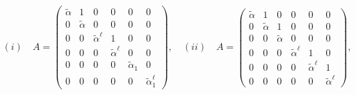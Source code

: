 \documentclass[11pt,a4paper]{article}
\theoremstyle{plain}
\theoremstyle{definition}
\theoremstyle{remark}
\begin{document}
\[
(i)\quad A =
\begin{pmatrix}
\tilde{\alpha} & 1 & 0 & 0 & 0 & 0\\
0 & \tilde{\alpha} & 0 & 0 & 0 & 0\\
0 & 0 & \tilde{\alpha}^\ell & 1 & 0 & 0\\
0 & 0 & 0 & \tilde{\alpha}^{\ell} & 0 & 0\\
0 & 0 & 0 & 0 & \tilde{\alpha}_1 & 0\\
0 & 0 & 0 & 0 & 0 & \tilde{\alpha}_1^{\ell}
\end{pmatrix},\quad (ii)\quad A =
\begin{pmatrix}
\tilde{\alpha} & 1 & 0 & 0 & 0 & 0\\
0 & \tilde{\alpha} & 1 & 0 & 0 & 0\\
0 & 0 & \tilde{\alpha} & 0 & 0 & 0\\
0 & 0 & 0 & \tilde{\alpha}^{\ell} & 1 & 0\\
0 & 0 & 0 & 0 & \tilde{\alpha}^{\ell} & 1\\
0 & 0 & 0 & 0 & 0 & \tilde{\alpha}^{\ell}
\end{pmatrix},
\]
\end{document}
